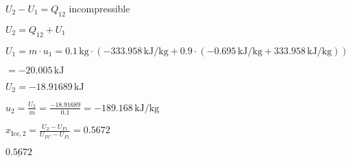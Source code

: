 \( U_2 - U_1 = Q_{12} \) incompressible  

\( U_2 = Q_{12} + U_1 \)  

\( U_1 = m \cdot u_1 = 0.1 \, \text{kg} \cdot (-333.958 \, \text{kJ/kg} + 0.9 \cdot (-0.695 \, \text{kJ/kg} + 333.958 \, \text{kJ/kg})) \)  

\( = -20.005 \, \text{kJ} \)  

\( U_2 = -18.91689 \, \text{kJ} \)  

\( u_2 = \frac{U_2}{m} = \frac{-18.91689}{0.1} = -189.168 \, \text{kJ/kg} \)  

\( x_{\text{Ice},2} = \frac{U_2 - U_{F1}}{U_{FC} - U_{F1}} = 0.5672 \)  

\( \underline{0.5672} \)